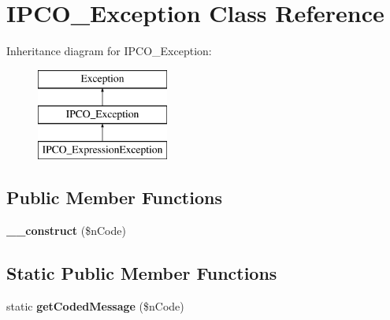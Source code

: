 \hypertarget{class_i_p_c_o___exception}{\section{I\-P\-C\-O\-\_\-\-Exception Class Reference}
\label{class_i_p_c_o___exception}
}
Inheritance diagram for I\-P\-C\-O\-\_\-\-Exception\-:\begin{figure}[H]
\begin{center}
\leavevmode
\includegraphics[height=3.000000cm]{class_i_p_c_o___exception}
\end{center}
\end{figure}
\subsection*{Public Member Functions}
\begin{DoxyCompactItemize}
\item 
\hypertarget{class_i_p_c_o___exception_aeb01b8ee3ffc54a625113c2f7bc8868d}{{\bfseries \-\_\-\-\_\-construct} (\$n\-Code)}\label{class_i_p_c_o___exception_aeb01b8ee3ffc54a625113c2f7bc8868d}

\end{DoxyCompactItemize}
\subsection*{Static Public Member Functions}
\begin{DoxyCompactItemize}
\item 
\hypertarget{class_i_p_c_o___exception_a0e85ff56bf73ee42521342c934f25aae}{static {\bfseries get\-Coded\-Message} (\$n\-Code)}\label{class_i_p_c_o___exception_a0e85ff56bf73ee42521342c934f25aae}

\end{DoxyCompactItemize}
